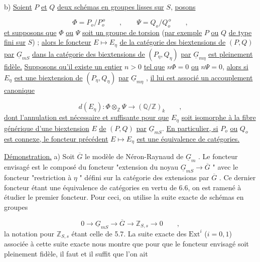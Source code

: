 
b)  \underline{Soient} $P$ \underline{et} $Q$ \underline{deux schémas en groupes lisses sur} $S$, \underline{posons}

\begin{equation*}
\Phi = P_o/P_o^{\,o} \qquad , \qquad \Psi = Q_o/Q_o^{\,o} \qquad ,
\end{equation*}
\underline{et supposons que} $\Phi$ \underline{ou} $\Psi$ \underline{soit un groupe de torsion} (\underline{par exemple} $P$ \underline{ou} $Q$ \underline{de type fini sur} $S$) ; \underline{alors le foncteur} $E \longmapsto E_\eta$ \underline{de la catégorie des biextensions de} $(P,Q)$ \underline{par} $\underline{G}_{mS}$ \underline{dans la catégorie des biextensions de} $(P_\eta,Q_\eta)$ \underline{par} $\underline{G}_{m\eta}$ \underline{est pleinement fidèle.} \underline{Supposons qu'il existe un entier} $n > 0$ \underline{tel que} $n\Phi=0$ \underline{ou} $n\Psi=0$, \underline{alors si} $E_\eta$ \underline{est une biextension de} $(P_\eta,Q_\eta)$ \underline{par} $\underline{G}_{m\eta}$ , \underline{il lui est associé un accouplement canonique}

\begin{equation}\tag{7.1.2}
d(E_\eta) : \Phi \otimes_{\mathbb{Z}} \Psi \longrightarrow (\mathbb{Q}/\mathbb{Z})_k \qquad ,
\end{equation}
\underline{dont l'annulation est nécessaire et suffisante pour que} $E_\eta$ \underline{soit isomorphe à la fibre générique d'une biextension} $E$ \underline{de} $(P,Q)$ \underline{par} $\underline{G}_{mS}$. \underline{En particulier, si} $P_o$ \underline{ou} $Q_o$ \underline{est connexe, le foncteur précédent} $E \longmapsto E_\eta$ \underline{est une équivalence de catégories.}

\underline{Démonstration.}  a)  Soit $\overline{G}$ le modèle de Néron-Raynaud de $\underline{G}_m$ . Le foncteur envisagé est le composé du foncteur "extension du noyau $\underline{G}_{mS} \longrightarrow \overline{G}$ " avec le foncteur "restriction à $\eta$ " défini sur la catégorie des extensions par $\overline{G}$ . Ce dernier foncteur étant une équivalence de catégories en vertu de 6.6, on est ramené à étudier le premier foncteur. Pour ceci, on utilise la suite exacte de schémas en groupes

\begin{equation}\tag{7.1.3}
0 \longrightarrow \underline{G}_{mS} \longrightarrow \overline{G} \longrightarrow \mathbb{Z}_{S,s} \longrightarrow 0 \qquad ,
\end{equation}
la notation pour $\mathbb{Z}_{S,s}$ étant celle de 5.7. La suite exacte des $\mathrm{Ext}^i$ ($i=0,1$) associée à cette suite exacte nous montre que pour que le foncteur envisagé soit pleinement fidèle, il faut et il suffit que l'on ait 


